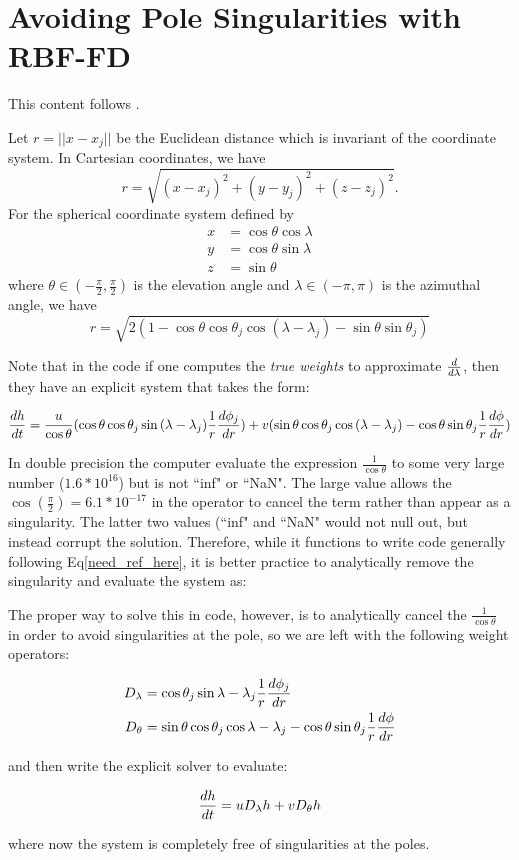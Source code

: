 \chapter{Avoiding Pole Singularities with RBF-FD}

This content follows \cite{FlyerWright07}. 

Let $r = || x - x_j ||$ be the Euclidean distance which is invariant of the coordinate system. In Cartesian coordinates, we have
$$
r = \sqrt{(x-x_j)^2 + (y-y_j)^2 + (z-z_j)^2}.
$$
For the spherical coordinate system defined by
\begin{align}
x & = \cos{\theta}\cos{\lambda} \\
y & = \cos{\theta}\sin{\lambda} \\
z & = \sin{\theta}
\end{align}
where $\theta \in (-\frac{\pi}{2}, \frac{\pi}{2})$ is the elevation angle and $\lambda \in (-\pi,\pi)$ is the azimuthal angle, we have
$$
r = \sqrt{2(1-\cos{\theta}\cos{\theta_j}\cos{(\lambda-\lambda_j)} - \sin{\theta}\sin{\theta_j})}
$$


Note that in the code if one computes the \emph{true weights} to approximate $\frac{d }{d \lambda}$, then they have an explicit system that takes the form: 

$$
\frac{d h}{d t} = \frac{u}{\cos{\theta}} ( \cos{\theta}\cos{\theta_j}\sin{(\lambda - \lambda_j)} \frac{1}{r} \frac{d \phi_j}{d r}) + v (\sin{\theta}\cos{\theta_j}\cos{(\lambda-\lambda_j)} - \cos{\theta}\sin{\theta_j} \frac{1}{r} \frac{d \phi}{d r})
$$

In double precision the computer evaluate the expression $\frac{1}{\cos{\theta}}$ to some very large number ($1.6 * 10^{16}$) but is not ``inf" or ``NaN". The large value allows the $\cos{(\frac{\pi}{2}) = 6.1 * 10^{-17}}$ in the operator to cancel the term rather than appear as a singularity. The latter two values (``inf" and ``NaN" would not null out, but instead corrupt the solution. Therefore, while it functions to write code generally following Eq\ref{need_ref_here}, it is better practice to analytically remove the singularity and evaluate the system as: 

The proper way to solve this in code, however, is to analytically cancel the $\frac{1}{\cos{\theta}}$ in order to avoid singularities at the pole, so we are left with the following weight operators: 

\begin{align}
D_\lambda & = \cos{\theta_j}\sin{\lambda - \lambda_j} \frac{1}{r} \frac{d \phi_j}{d r} \\
D_\theta &=  \sin{\theta}\cos{\theta_j}\cos{\lambda-\lambda_j} - \cos{\theta}\sin{\theta_j} \frac{1}{r} \frac{d \phi}{d r}
\end{align} 

and then write the explicit solver to evaluate: 

$$
\frac{d h}{d t} = u D_\lambda h + v D_\theta h
$$

where now the system is completely free of singularities at the poles. 
